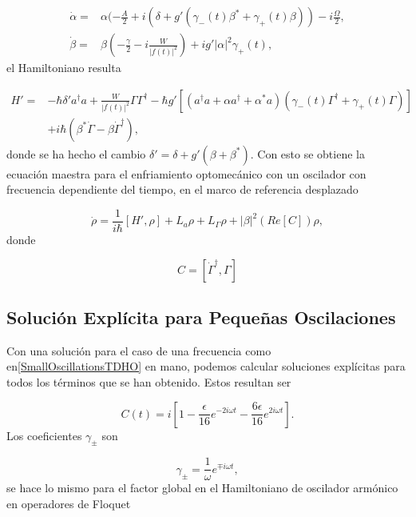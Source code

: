 \documentclass[10pt,a4paper]{report}
\begin{document}
\begin{align}
\dot{\alpha} =& \alpha(-\frac{A}{2}+i(\delta+g'(\gamma_-(t) \beta^* + \gamma_+(t) \beta))-i\frac{\Omega}{2},\\
\dot{\beta} =& \beta(-\frac{\gamma}{2}-i\frac{W}{|f(t)|^2})+ig'|\alpha|^2\gamma_+(t),
\end{align} el Hamiltoniano resulta


\begin{align*}
H'=& -\hbar \delta' a^\dagger a + \frac{W}{|f(t)|^2}\Gamma \Gamma^\dagger -\hbar g'[(a^{\dagger}a +\alpha a^{\dagger}+\alpha^* a)(\gamma_-(t)\Gamma^{\dagger}+\gamma_+(t)\Gamma)]\\
&+ i\hbar(\beta^*\dot{\Gamma} - \beta \dot{\Gamma}^\dagger),
\end{align*}  donde se ha hecho el cambio $\delta' = \delta + g'(\beta + \beta^*)$. Con esto se obtiene la ecuación maestra para el enfriamiento optomecánico con un oscilador con frecuencia dependiente del tiempo, en el marco de referencia desplazado


\begin{equation}\label{DLCMasterEquation}
\dot{\rho} = \frac{1}{i\hbar}[H',\rho] + L_a\rho + L_\Gamma\rho + |\beta|^2(Re[C])\rho,
\end{equation} donde 

\begin{equation}
C = [\dot{\Gamma}^\dagger, \Gamma]
\end{equation} 


\subsection{Solución Explícita para Pequeñas Oscilaciones }

Con una solución para el caso de una frecuencia como en\eqref{SmallOscillationsTDHO}  en mano, podemos calcular soluciones explícitas para todos los términos que se han obtenido. Estos resultan ser\cite{TesisMaestria}

\begin{equation}
C(t) = i [1 -\frac{\epsilon}{16}e^{-2i\omega t}-\frac{6\epsilon}{16}e^{2i\omega t}].
\end{equation} Los coeficientes $\gamma_{\pm}$ son

\begin{equation}
\gamma_\pm= \frac{1}{\omega}e^{\mp i\omega t},
\end{equation} se hace lo mismo para el factor global en el Hamiltoniano de oscilador armónico en operadores de Floquet
\end{document}
